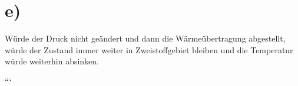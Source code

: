 

\section*{e)}

Würde der Druck nicht geändert und dann die Wärmeübertragung abgestellt, würde der Zustand immer weiter in Zweistoffgebiet bleiben und die Temperatur würde weiterhin absinken.

```